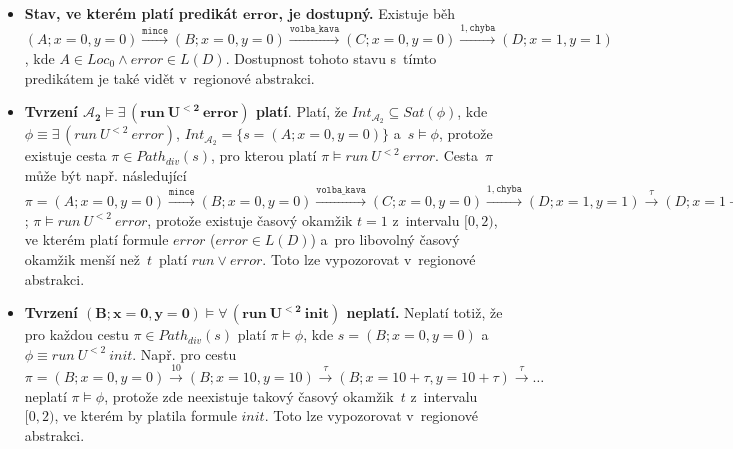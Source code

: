 \documentclass[a4paper, 11pt]{scrartcl}
\begin{document}
    \begin{itemize}
        \item
            \textbf{Stav, ve kterém platí predikát $ \boldsymbol{error} $, je
            dostupný.} Existuje běh $ (A; x = 0, y = 0) \xrightarrow{\mathtt{
            mince}} (B; x = 0, y = 0) \xrightarrow{\mathtt{volba\_kava}} (C;
            x = 0, y = 0) \xrightarrow{1, \mathtt{chyba}} (D; x = 1, y = 1) $,
            kde $ A \in Loc_0 \wedge error \in L(D) $. Dostupnost tohoto
            stavu s~tímto predikátem je také vidět v~regionové abstrakci.

        \item
            \textbf{Tvrzení $ \boldsymbol{\mathcal{A}_2 \models \exists\,(
            run\ U^{< 2}\ error)} $ platí}. Platí, že $ Int_{\mathcal{A}_2}
            \subseteq Sat(\phi) $, kde $ \phi \equiv \exists\,(run\ U^{< 2}
            \ error) $, $ Int_{\mathcal{A}_2} = \{s = (A; x = 0, y = 0)\} $
            a~$ s \models \phi $, protože existuje cesta $ \pi \in Path_{div}(
            s) $, pro kterou platí $ \pi \models run\ U^{< 2}\ error $.
            Cesta~$ \pi $ může být např. následující $ \pi = (A; x = 0, y = 0)
            \xrightarrow{\mathtt{ mince}} (B; x = 0, y = 0) \xrightarrow{
            \mathtt{volba\_kava}} (C; x = 0, y = 0) \xrightarrow{1, \mathtt{
            chyba}} (D; x = 1, y = 1) \xrightarrow{\tau} (D; x = 1 + \tau, y =
            1 + \tau) \xrightarrow{\tau} \dots $; $ \pi \models run\ U^{< 2}
            \ error $, protože existuje časový okamžik $ t = 1 $ z~intervalu
            $ [0, 2) $, ve kterém platí formule $ error $ ($ error \in L(D) $)
            a~pro libovolný časový okamžik menší než~$ t $~platí $ run \vee
            error $. Toto lze vypozorovat v~regionové abstrakci.

        \item
            \textbf{Tvrzení $ \boldsymbol{(B; x = 0, y = 0) \models \forall\,(
            run\ U^{< 2}\ init)} $ neplatí.} Neplatí totiž, že pro každou
            cestu $ \pi \in Path_{div}(s) $ platí $ \pi \models \phi $,
            kde $ s = (B; x = 0, y = 0) $ a~$ \phi \equiv run\ U^{< 2}\ init $.
            Např. pro cestu $ \pi = (B; x = 0, y = 0) \xrightarrow{10} (B; x =
            10, y = 10) \xrightarrow{\tau} (B; x = 10 + \tau, y = 10 + \tau)
            \xrightarrow{\tau} \dots $ neplatí $ \pi \models \phi $, protože
            zde neexistuje takový časový okamžik~$ t $ z~intervalu $ [0, 2) $,
            ve kterém by platila formule $ init $. Toto lze vypozorovat
            v~regionové abstrakci.
    \end{itemize}
\end{document}
